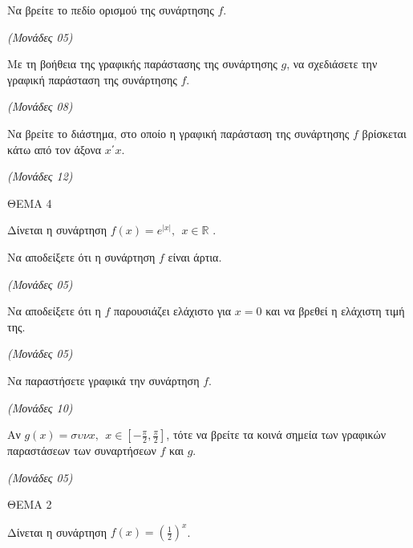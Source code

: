 \documentclass[11pt,a4paper,twoside]{book}
\newcommand{\monades}[1]{\hfill \textit{(Μονάδες #1)}}
\begin{document}
\begin{alist}
\item Να βρείτε το πεδίο ορισμού της συνάρτησης $f$.

\monades{05}

\item Με τη βοήθεια της γραφικής παράστασης της συνάρτησης $g$, να σχεδιάσετε την γραφική παράσταση της συνάρτησης $f$.

\monades{08}

\item Να βρείτε το διάστημα, στο οποίο η γραφική παράσταση της συνάρτησης $f$ βρίσκεται κάτω από τον άξονα $x΄x$.

\monades{12}
\end{alist}

\vspace{4mm}

ΘΕΜΑ 4

Δίνεται η συνάρτηση $f(x) = e^{|x|},\ \ x \in \mathbb{R}$ .

\begin{alist}
\item Να αποδείξετε ότι η συνάρτηση $f$ είναι άρτια.

\monades{05}

\item Να αποδείξετε ότι η $f$ παρουσιάζει ελάχιστο για $x = 0$ και να βρεθεί η ελάχιστη τιμή της.

\monades{05}

\item Να παραστήσετε γραφικά την συνάρτηση $f$.

\monades{10}

\item Αν $g(x) = \sigma\upsilon\nu x,\ \ x \in \left\lbrack - \frac{\pi}{2},\frac{\pi}{2} \right\rbrack$, τότε να βρείτε τα κοινά σημεία των γραφικών παραστάσεων των συναρτήσεων $f$ και $g$.

\monades{05}
\end{alist}

\vspace{4mm}

ΘΕΜΑ 2

Δίνεται η συνάρτηση $f(x) = \left( \frac{1}{2} \right)^{x}$.
\end{document}
